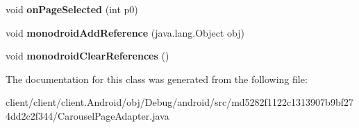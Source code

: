 \begin{DoxyCompactItemize}
\item 
\hypertarget{classmd5282f1122c1313907b9bf274dd2c2f344_1_1CarouselPageAdapter_a0b82f3484622bc9979d85f00d74a975f}{}void {\bfseries on\+Page\+Selected} (int p0)\label{classmd5282f1122c1313907b9bf274dd2c2f344_1_1CarouselPageAdapter_a0b82f3484622bc9979d85f00d74a975f}

\item 
\hypertarget{classmd5282f1122c1313907b9bf274dd2c2f344_1_1CarouselPageAdapter_a3a2f81edacbe4c3d134c82a7fd75dc7a}{}void {\bfseries monodroid\+Add\+Reference} (java.\+lang.\+Object obj)\label{classmd5282f1122c1313907b9bf274dd2c2f344_1_1CarouselPageAdapter_a3a2f81edacbe4c3d134c82a7fd75dc7a}

\item 
\hypertarget{classmd5282f1122c1313907b9bf274dd2c2f344_1_1CarouselPageAdapter_a2fa732271c5fe22ff3bdacff37c22170}{}void {\bfseries monodroid\+Clear\+References} ()\label{classmd5282f1122c1313907b9bf274dd2c2f344_1_1CarouselPageAdapter_a2fa732271c5fe22ff3bdacff37c22170}

\end{DoxyCompactItemize}


The documentation for this class was generated from the following file\+:\begin{DoxyCompactItemize}
\item 
client/client/client.\+Android/obj/\+Debug/android/src/md5282f1122c1313907b9bf274dd2c2f344/Carousel\+Page\+Adapter.\+java\end{DoxyCompactItemize}
